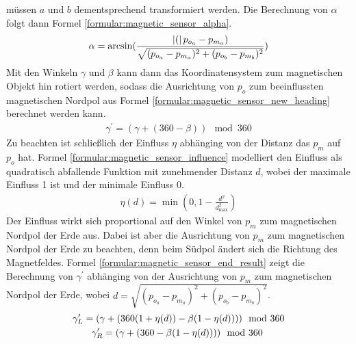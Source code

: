 müssen $a$ und $b$ dementsprechend transformiert werden.
Die Berechnung von $\alpha$ folgt dann Formel \ref{formular:magnetic_sensor_alpha}.
\begin{align}
    \label{formular:magnetic_sensor_alpha}
    \alpha = \arcsin (\frac{\left|{(}\right|p_{o_a} - p_{m_a})}{\sqrt{(p_{o_a} - p_{m_a})^2 + (p_{o_b} - p_{m_b})^2}})
\end{align}
Mit den Winkeln $\gamma$ und $\beta$ kann dann das Koordinatensystem zum magnetischen Objekt hin rotiert werden,
sodass die Ausrichtung von $p_{o}$ zum beeinflussten magnetischen Nordpol aus Formel \ref{formular:magnetic_sensor_new_heading} berechnet werden kann.
\begin{align}
    \label{formular:magnetic_sensor_new_heading}
    \gamma^{\prime} = (\gamma + (360 - \beta))\mod 360
\end{align}
Zu beachten ist schließlich der Einfluss $\eta$ abhänging von der Distanz das $p_{m}$ auf $p_{o}$ hat.
Formel \ref{formular:magnetic_sensor_influence} modelliert den Einfluss als quadratisch abfallende Funktion mit zunehmender Distanz $d$,
wobei der maximale Einfluss 1 ist und der minimale Einfluss 0.
\begin{align}
    \label{formular:magnetic_sensor_influence}
    \eta(d) = \min(0, 1 - \frac{d^2}{d_{\max}^2})
\end{align}
Der Einfluss wirkt sich proportional auf den Winkel von $p_{m}$ zum magnetischen Nordpol der Erde aus.
Dabei ist aber die Ausrichtung von $p_{m}$ zum magnetischen Nordpol der Erde zu beachten, denn beim Südpol ändert sich die Richtung des Magnetfeldes.
Formel \ref{formular:magnetic_sensor_end_result} zeigt die Berechnung von $\gamma^{\prime}$ abhänging von der Ausrichtung von $p_{m}$ zum magnetischen Nordpol der Erde,
wobei $d = \sqrt{(p_{o_a} - p_{m_a})^2 + (p_{o_b} - p_{m_b})^2}$.
\begin{align}
    \label{formular:magnetic_sensor_end_result}
    \gamma^{\prime}_L = (\gamma + (360(1 + \eta(d)) - \beta(1 - \eta(d))))\mod 360 \\\nonumber
    \gamma^{\prime}_R = (\gamma + (360 - \beta(1 - \eta(d))))\mod 360 \hspace{0.8cm}
\end{align}

